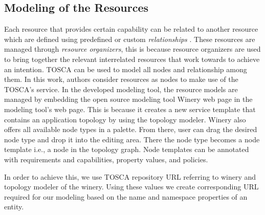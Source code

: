 \subsection{Modeling of the Resources}
Each resource that provides certain capability can be related to another resource which are defined using predefined or custom \textit{relationships} \cite{Sungur2014a}. These resources are managed through \textit{resource organizers}, this is because resource organizers are used to bring together the relevant interrelated resources that work towards to achieve an intention. TOSCA \cite{Binz2014} can be used to model all nodes and relationship among them. In this work, authors consider resources as nodes to make use of the TOSCA's service. In the developed modeling tool, the resource models are managed by embedding the open source modeling tool Winery web page \cite{Kopp2013} in the modeling tool's web page. This is because it creates a new service template that contains an application topology by using the topology modeler. Winery also offers all available node types in a palette. From there, user can drag the desired node type and drop it into the editing area. There the node type becomes a node template i.e., a node in the topology graph. Node templates can be annotated with requirements and capabilities, property values, and policies.

In order to achieve this, we use TOSCA repository URL referring to winery and topology modeler of the winery. Using these values we create corresponding URL required for our modeling based on the name and namespace properties of an entity. 

